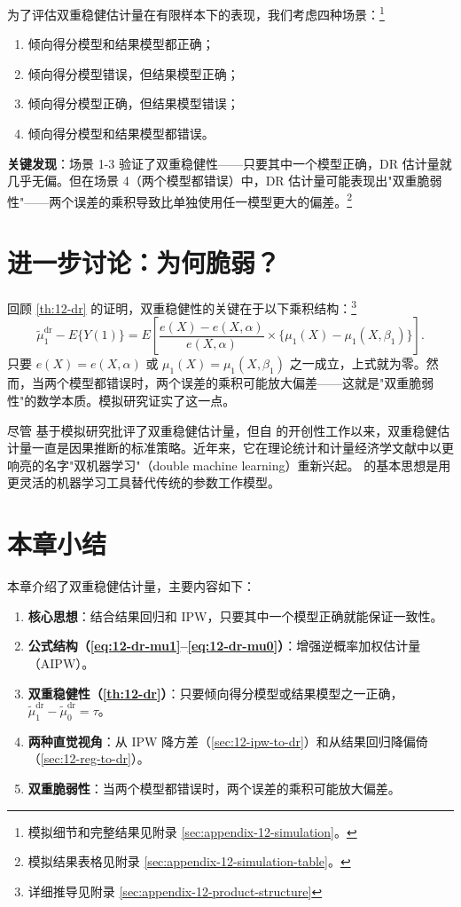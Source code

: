 为了评估双重稳健估计量在有限样本下的表现，我们考虑四种场景：\footnote{模拟细节和完整结果见附录 \cref{sec:appendix-12-simulation}。}
\begin{enumerate}
  \item 倾向得分模型和结果模型都正确；
  \item 倾向得分模型错误，但结果模型正确；
  \item 倾向得分模型正确，但结果模型错误；
  \item 倾向得分模型和结果模型都错误。
\end{enumerate}

\textbf{关键发现}：场景 1-3 验证了双重稳健性——只要其中一个模型正确，DR 估计量就几乎无偏。但在场景 4（两个模型都错误）中，DR 估计量可能表现出"双重脆弱性"——两个误差的乘积导致比单独使用任一模型更大的偏差。\footnote{模拟结果表格见附录 \cref{sec:appendix-12-simulation-table}。}

\section{进一步讨论：为何脆弱？}\label{sec:12-discussion}

回顾 \cref{th:12-dr} 的证明，双重稳健性的关键在于以下乘积结构：\footnote{详细推导见附录 \cref{sec:appendix-12-product-structure}}
\[
\tilde\mu_1^{\mathrm{dr}} - E\{Y(1)\} = E\left[\frac{e(X) - e(X, \alpha)}{e(X, \alpha)} \times \{\mu_1(X) - \mu_1(X, \beta_1)\}\right].
\]
只要 $e(X) = e(X, \alpha)$ 或 $\mu_1(X) = \mu_1(X, \beta_1)$ 之一成立，上式就为零。然而，当两个模型都错误时，两个误差的乘积可能放大偏差——这就是"双重脆弱性"的数学本质。模拟研究证实了这一点。

尽管 \cite{KangSchafer:2007} 基于模拟研究批评了双重稳健估计量，但自 \cite{Scharfstein:1999} 的开创性工作以来，双重稳健估计量一直是因果推断的标准策略。近年来，它在理论统计和计量经济学文献中以更响亮的名字"双机器学习"（double machine learning）重新兴起。\cite{Chernozhukov:2018} 的基本思想是用更灵活的机器学习工具替代传统的参数工作模型。

\section{本章小结}\label{sec:12-summary}

本章介绍了双重稳健估计量，主要内容如下：

\begin{enumerate}
  \item \textbf{核心思想}：结合结果回归和 IPW，只要其中一个模型正确就能保证一致性。
  \item \textbf{公式结构（\cref{eq:12-dr-mu1}--\cref{eq:12-dr-mu0}）}：增强逆概率加权估计量（AIPW）。
  \item \textbf{双重稳健性（\cref{th:12-dr}）}：只要倾向得分模型或结果模型之一正确，$\tilde\mu_1^{\mathrm{dr}} - \tilde\mu_0^{\mathrm{dr}} = \tau$。
  \item \textbf{两种直觉视角}：从 IPW 降方差（\cref{sec:12-ipw-to-dr}）和从结果回归降偏倚（\cref{sec:12-reg-to-dr}）。
  \item \textbf{双重脆弱性}：当两个模型都错误时，两个误差的乘积可能放大偏差。
\end{enumerate}

